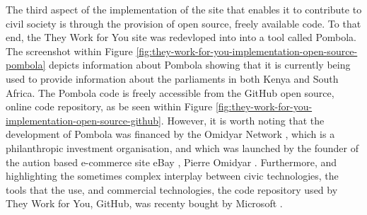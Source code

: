 The third aspect of the implementation of the site that enables it to contribute to civil society is through the provision of open source, freely available code.
To that end, the They Work for You site was redevloped into into a tool called Pombola.
The screenshot within Figure \ref{fig:they-work-for-you-implementation-open-source-pombola} depicts information about Pombola showing that it is currently being used to provide information about the parliaments in both Kenya and South Africa.
The Pombola code \cite{mysociety-github} is freely accessible from the GitHub \cite{github} open source, online code repository, as be seen within Figure \ref{fig:they-work-for-you-implementation-open-source-github}.
However, it is worth noting that the development of Pombola was financed by the Omidyar Network \cite{omidyar-network}, which is a philanthropic investment organisation, and which was launched by the founder of the aution based e-commerce site eBay \cite{ebay}, Pierre Omidyar \cite{pierre-omidyar}.
Furthermore, and highlighting the sometimes complex interplay between civic technologies, the tools that the use, and commercial technologies, the code repository used by They Work for You, GitHub, was recenty bought by Microsoft \cite{microsoft-buys-github}.
